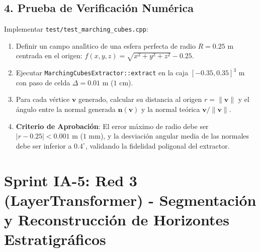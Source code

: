 \documentclass[11pt,a4paper]{article}
\begin{document}
\subsection{4. Prueba de Verificaci{\'o}n Num{\'e}rica}
Implementar \texttt{test/test\_marching\_cubes.cpp}:
\begin{enumerate}
    \item Definir un campo anal{\'\i}tico de una esfera perfecta de radio $R = 0.25\text{ m}$ centrada en el origen: $f(x, y, z) = \sqrt{x^2 + y^2 + z^2} - 0.25$.
    \item Ejecutar \texttt{MarchingCubesExtractor::extract} en la caja $[-0.35, 0.35]^3\text{ m}$ con paso de celda $\Delta = 0.01\text{ m}$ ($1\text{ cm}$).
    \item Para cada v{\'e}rtice $\mathbf{v}$ generado, calcular su distancia al origen $r = \|\mathbf{v}\|$ y el {\'a}ngulo entre la normal generada $\mathbf{n}(\mathbf{v})$ y la normal te{\'o}rica $\mathbf{v} / \|\mathbf{v}\|$.
    \item \textbf{Criterio de Aprobaci{\'o}n}: El error m{\'a}ximo de radio debe ser $|r - 0.25| < 0.001\text{ m}$ ($1\text{ mm}$), y la desviaci{\'o}n angular media de las normales debe ser inferior a $0.4^\circ$, validando la fidelidad poligonal del extractor.
\end{enumerate}

\newpage

\section{Sprint IA-5: Red 3 (LayerTransformer) - Segmentaci{\'o}n y Reconstrucci{\'o}n de Horizontes Estratigr{\'a}ficos}
\end{document}
